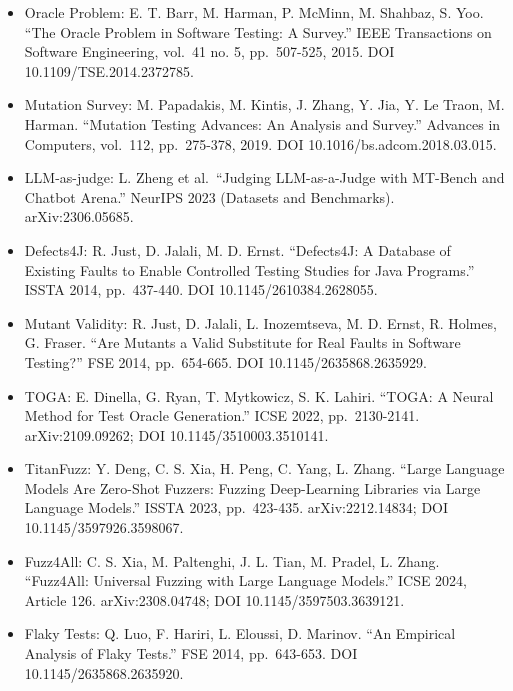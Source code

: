 \documentclass[
  11pt,
]{article}
\begin{document}
\begin{itemize}
  arXiv:2606.10702.
\item
  Oracle Problem: E. T. Barr, M. Harman, P. McMinn, M. Shahbaz, S. Yoo.
  ``The Oracle Problem in Software Testing: A Survey.'' IEEE
  Transactions on Software Engineering, vol.~41 no. 5, pp.~507-525,
  2015. DOI 10.1109/TSE.2014.2372785.
\item
  Mutation Survey: M. Papadakis, M. Kintis, J. Zhang, Y. Jia, Y. Le
  Traon, M. Harman. ``Mutation Testing Advances: An Analysis and
  Survey.'' Advances in Computers, vol.~112, pp.~275-378, 2019. DOI
  10.1016/bs.adcom.2018.03.015.
\item
  LLM-as-judge: L. Zheng et al.~``Judging LLM-as-a-Judge with MT-Bench
  and Chatbot Arena.'' NeurIPS 2023 (Datasets and Benchmarks).
  arXiv:2306.05685.
\item
  Defects4J: R. Just, D. Jalali, M. D. Ernst. ``Defects4J: A Database of
  Existing Faults to Enable Controlled Testing Studies for Java
  Programs.'' ISSTA 2014, pp.~437-440. DOI 10.1145/2610384.2628055.
\item
  Mutant Validity: R. Just, D. Jalali, L. Inozemtseva, M. D. Ernst, R.
  Holmes, G. Fraser. ``Are Mutants a Valid Substitute for Real Faults in
  Software Testing?'' FSE 2014, pp.~654-665. DOI 10.1145/2635868.2635929.
\item
  TOGA: E. Dinella, G. Ryan, T. Mytkowicz, S. K. Lahiri. ``TOGA: A
  Neural Method for Test Oracle Generation.'' ICSE 2022, pp.~2130-2141.
  arXiv:2109.09262; DOI 10.1145/3510003.3510141.
\item
  TitanFuzz: Y. Deng, C. S. Xia, H. Peng, C. Yang, L. Zhang. ``Large
  Language Models Are Zero-Shot Fuzzers: Fuzzing Deep-Learning Libraries
  via Large Language Models.'' ISSTA 2023, pp.~423-435.
  arXiv:2212.14834; DOI 10.1145/3597926.3598067.
\item
  Fuzz4All: C. S. Xia, M. Paltenghi, J. L. Tian, M. Pradel, L. Zhang.
  ``Fuzz4All: Universal Fuzzing with Large Language Models.'' ICSE 2024,
  Article 126. arXiv:2308.04748; DOI 10.1145/3597503.3639121.
\item
  Flaky Tests: Q. Luo, F. Hariri, L. Eloussi, D. Marinov. ``An Empirical
  Analysis of Flaky Tests.'' FSE 2014, pp.~643-653. DOI
  10.1145/2635868.2635920.
\end{itemize}
\end{document}
